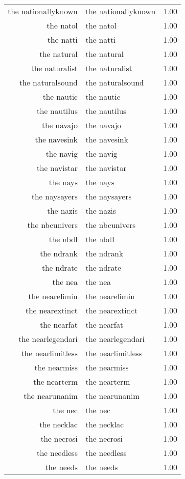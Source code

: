 \begin{table}[ht]
\begin{tabular}{rlr}
  the nationallyknown & the nationallyknown & 1.00 \\ 
  the natol & the natol & 1.00 \\ 
  the natti & the natti & 1.00 \\ 
  the natural & the natural & 1.00 \\ 
  the naturalist & the naturalist & 1.00 \\ 
  the naturalsound & the naturalsound & 1.00 \\ 
  the nautic & the nautic & 1.00 \\ 
  the nautilus & the nautilus & 1.00 \\ 
  the navajo & the navajo & 1.00 \\ 
  the navesink & the navesink & 1.00 \\ 
  the navig & the navig & 1.00 \\ 
  the navistar & the navistar & 1.00 \\ 
  the nays & the nays & 1.00 \\ 
  the naysayers & the naysayers & 1.00 \\ 
  the nazis & the nazis & 1.00 \\ 
  the nbcunivers & the nbcunivers & 1.00 \\ 
  the nbdl & the nbdl & 1.00 \\ 
  the ndrank & the ndrank & 1.00 \\ 
  the ndrate & the ndrate & 1.00 \\ 
  the nea & the nea & 1.00 \\ 
  the nearelimin & the nearelimin & 1.00 \\ 
  the nearextinct & the nearextinct & 1.00 \\ 
  the nearfat & the nearfat & 1.00 \\ 
  the nearlegendari & the nearlegendari & 1.00 \\ 
  the nearlimitless & the nearlimitless & 1.00 \\ 
  the nearmiss & the nearmiss & 1.00 \\ 
  the nearterm & the nearterm & 1.00 \\ 
  the nearunanim & the nearunanim & 1.00 \\ 
  the nec & the nec & 1.00 \\ 
  the necklac & the necklac & 1.00 \\ 
  the necrosi & the necrosi & 1.00 \\ 
  the needless & the needless & 1.00 \\ 
  the needs & the needs & 1.00 \\ 

\end{tabular}
\end{table}

